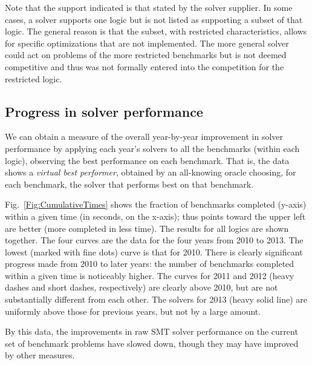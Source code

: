 \documentclass{eptcs}
\begin{document}
Note that the support indicated is that stated by the solver supplier. In some cases, a solver supports one logic but is not listed as supporting a subset of that logic. The general reason is that the subset, with restricted characteristics, allows for specific optimizations that are not implemented. The more general solver could act on problems of the
more restricted benchmarks but is not deemed competitive and thus was not formally entered into the competition for the restricted logic.


\subsection{Progress in solver performance}
\label{Progress}

We can obtain a measure of the overall year-by-year improvement in solver performance by applying each year's solvers to all the benchmarks (within each logic), observing the best performance on each benchmark. That is, the data shows a {\em virtual best performer}, obtained by an all-knowing oracle choosing, for each benchmark, the solver that performs best on that benchmark.

Fig.~\ref{Fig:CumulativeTimes} shows the fraction of benchmarks completed (y-axis) within a given time (in seconds, on the x-axis); thus points toward the upper left are better (more completed in less time). The results for all logics are shown together. The four curves are the data for the four years from 2010 to 2013. The lowest (marked with fine dots) curve is that for 2010. There is clearly significant progress made from 2010 to later years: the number of benchmarks completed within a given time is noticeably higher. The curves for 2011 and 2012 (heavy dashes and short dashes, respectively) are clearly above 2010, but are not substantially different from each other. The solvers for 2013 (heavy solid line) are uniformly above those for previous years, but not by a large amount.  

By this data, the improvements in raw SMT solver performance on the current set of benchmark problems have slowed down, though they may have improved by other measures.
\end{document}

